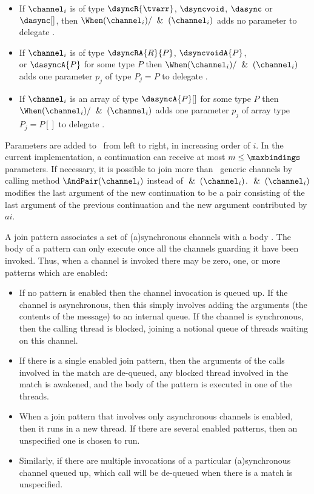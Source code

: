 \begin{itemize}
\item
If $\channel_i$ is of type $\dsyncR{\tvarr}$, $\dsyncvoid$, $\dasync$ or  $\dasync[]$, then $\When(\channel_i)/\And(\channel_i)$ adds no parameter to delegate \delegate.

\item
If $\channel_i$ is of type $\dsyncRA{R}{P}$, $\dsyncvoidA{P}$, \\ or $\dasyncA{P}$  for some type $P$ then $\When(\channel_i)/\And(\channel_i)$ 
adds one parameter $p_j$ of type $P_j=P$ to delegate \delegate.

\item
If $\channel_i$ is an array of type $\dasyncA{P}[]$ for some type $P$ then $\When(\channel_i)/\And(\channel_i)$ 
adds one parameter $p_j$ of array type $P_j=P[]$ to delegate \delegate.
\end{itemize}

Parameters are added to \delegate\ from left to right, in increasing order of 
$i$. In the current implementation, a continuation can receive at most $m\leq\maxbindings$ parameters. If necessary,
 it is possible to join more than \maxbindings\ generic channels by calling  method $\AndPair(\channel_i)$ instead of $\And(\channel_i)$. 
$\And(\channel_i)$  modifies the last argument of the new continuation to be a pair consisting of the last argument
of the previous continuation and the new argument contributed by $ai$.




A join pattern associates a set of (a)synchronous channels with a body \delegate.
The body of a pattern can only execute once all the
channels guarding it have been invoked. Thus, when a channel is 
invoked there may be zero, one, or more patterns which are enabled:
\begin{itemize}
\item
If no pattern is enabled then the channel invocation is queued up. If the channel is asynchronous,
then this simply involves adding the arguments (the contents of the message) to an internal queue.
If the channel is synchronous, then the calling thread is blocked, joining a notional queue of threads waiting on this channel.
\item
If there is a single enabled join pattern, then the arguments of the calls involved in the match are de-queued,
any blocked thread involved in the match is awakened, and the body of the pattern is executed in one of the threads.
\item
When a join pattern that involves only asynchronous channels is enabled, then it runs in a new thread.
If there are several enabled patterns, then an unspecified one is chosen to run.
\item
Similarly, if there are multiple invocations of a particular (a)synchronous channel queued up, 
which call will be de-queued when there is a match is unspecified.
\end{itemize}

